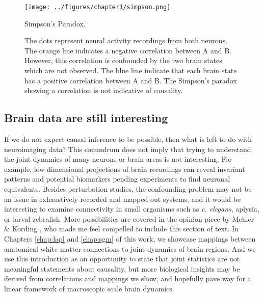 \begin{figure}[htbp]
	\centering
	\texttt{[image: ../figures/chapter1/simpson.png]}
	\caption{Simpson's Paradox.}
	\caption*{The dots represent neural activity recordings from both neurons. The orange line indicates a negative correlation between A and B. However, this correlation is confounded by the two brain states which are not observed. The blue line indicate that each brain state has a positive correlation between A and B. The Simpson's paradox showing a correlation is not indicative of causality.}
	\label{fig:simpson}
\end{figure}

\subsection{Brain data are still interesting}
If we do not expect causal inference to be possible, then what is left to do with neuroimaging data? This conundrum does not imply that trying to understand the joint dynamics of many neurons or brain areas is not interesting. For example, low dimensional projections of brain recordings can reveal invariant patterns \cite{bruno_spiral_2017,gordon_precision_2017} and potential biomarkers \cite{marceau_biomarker_2018,desowska_dynamics_2019,beijers_data-driven_2019} pending experiments to find neuronal equivalents. Besides perturbation studies, the confounding problem may not be an issue in exhaustively recorded and mapped out systems, and it would be interesting to examine connectivity in small organisms such as \emph{c. elegans}, aplysia, or larval zebrafish. More possibilities are covered in the opinion piece by Mehler \& Kording \cite{mehler_lure_2020}, who made me feel compelled to include this section of text. In Chapters \ref{chap:lap} and \ref{chap:sgm} of this work, we showcase mappings between anatomical white-matter connections to joint dynamics of brain regions. And we use this introduction as an opportunity to state that joint statistics are not meaningful statements about causality, but more biological insights may be derived from correlations and mappings we show, and hopefully pave way for a linear framework of macroscopic scale brain dynamics.

